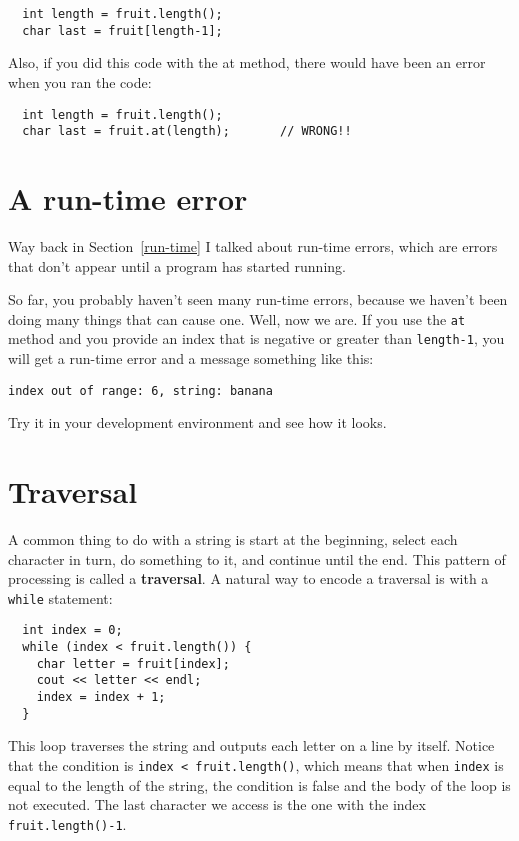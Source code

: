 \begin{verbatim}
  int length = fruit.length();
  char last = fruit[length-1];
\end{verbatim}

Also, if you did this code with the at method, there would have
been an error when you ran the code:
\begin{verbatim}
  int length = fruit.length();
  char last = fruit.at(length);       // WRONG!!
\end{verbatim}

\section{A run-time error}

Way back in Section~\ref{run-time} I talked about run-time errors,
which are errors that don't appear until a program has started
running.

So far, you probably haven't seen many run-time errors, because we
haven't been doing many things that can cause one.  Well, now we are.
If you use the {\tt at} method and you provide an index that is
negative or greater than {\tt length-1}, you will get a run-time
error and a message something like this:

\begin{verbatim}
index out of range: 6, string: banana
\end{verbatim}
%
Try it in your development environment and see how it looks.


\section{Traversal}

A common thing to do with a string is
start at the beginning, select each character in turn, do
something to it, and continue until the end.  This pattern
of processing is called a {\bf traversal}.  A natural
way to encode a traversal is with a {\tt while} statement:

\begin{verbatim}
  int index = 0;
  while (index < fruit.length()) {
    char letter = fruit[index];
    cout << letter << endl;
    index = index + 1;
  }
\end{verbatim}
%
This loop traverses the string and outputs each letter on
a line by itself.  Notice that the condition is
{\tt index < fruit.length()}, which means that when
{\tt index} is equal to the length of the string, the
condition is false and the body of the loop is not executed.
The last character we access is the one with the
index {\tt fruit.length()-1}.

